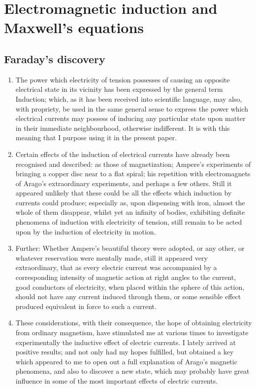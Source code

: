 \chapter{Electromagnetic induction and Maxwell's equations}

\section{Faraday's discovery}

{\small
\begin{enumerate}

\item The power which electricity of tension possesses of causing an opposite
electrical state in its vicinity has been expressed by the general term Induction;
which, as it has been received into scientific language, may also, with
propriety, be used in the same general sense to express the power which
electrical currents may possess of inducing any particular state upon matter
in their immediate neighbourhood, otherwise indifferent. It is with this
meaning that I purpose using it in the present paper.

\item Certain effects of the induction of electrical currents have already been
recognised and described: as those of magnetization; Ampere's experiments
of bringing a copper disc near to a flat spiral; his repetition with electromagnets
of Arago's extraordinary experiments, and perhaps a few others.
Still it appeared unlikely that these could be all the effects which induction
by currents could produce; especially as, upon dispensing with iron, almost
the whole of them disappear, whilst yet an infinity of bodies, exhibiting
definite phenomena of induction with electricity of tension, still remain to
be acted upon by the induction of electricity in motion.

\item Further: Whether Ampere's beautiful theory were adopted, or any
other, or whatever reservation were mentally made, still it appeared very
extraordinary, that as every electric current was accompanied by a corresponding
intensity of magnetic action at right angles to the current, good
conductors of electricity, when placed within the sphere of this action, should
not have any current induced through them, or some sensible effect produced
equivalent in force to such a current.

\item These considerations, with their consequence, the hope of obtaining
electricity from ordinary magnetism, have stimulated me at various times
to investigate experimentally the inductive effect of electric currents. I lately
arrived at positive results; and not only had my hopes fulfilled, but obtained
a key which appeared to me to open out a full explanation of Arago's magnetic
phenomena, and also to discover a new state, which may probably have
great influence in some of the most important effects of electric currents.


\end{enumerate}}
